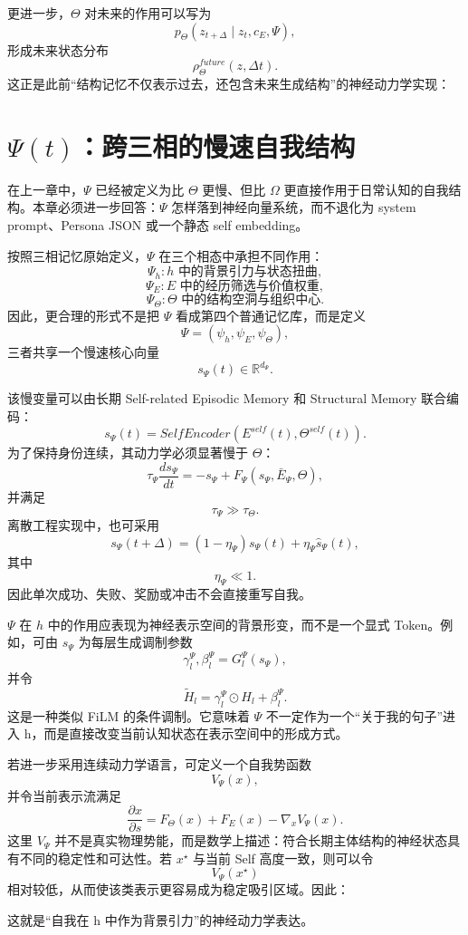 更进一步，$\Theta$ 对未来的作用可以写为
\[
p_\Theta
\left(
z_{t+\Delta}
\mid
z_t,c_E,\Psi
\right),
\]
形成未来状态分布
\[
\rho_\Theta^{future}(z,\Delta t).
\]
这正是此前“结构记忆不仅表示过去，还包含未来生成结构”的神经动力学实现：
\begin{statementbox}
\centering
{}
\end{statementbox}

\section{$\Psi(t)$：跨三相的慢速自我结构}

在上一章中，$\Psi$ 已经被定义为比 $\Theta$ 更慢、但比 $\Omega$ 更直接作用于日常认知的自我结构。本章必须进一步回答：$\Psi$ 怎样落到神经向量系统，而不退化为 system prompt、Persona JSON 或一个静态 self embedding。

按照三相记忆原始定义，$\Psi$ 在三个相态中承担不同作用：
\[
\Psi_h:
\text{$h$ 中的背景引力与状态扭曲},
\]
\[
\Psi_E:
\text{$E$ 中的经历筛选与价值权重},
\]
\[
\Psi_\Theta:
\text{$\Theta$ 中的结构空洞与组织中心}.
\]
因此，更合理的形式不是把 $\Psi$ 看成第四个普通记忆库，而是定义
\[
\Psi
=
\left(
\psi_h,\psi_E,\psi_\Theta
\right),
\]
三者共享一个慢速核心向量
\[
s_\Psi(t)
\in
\mathbb{R}^{d_\Psi}.
\]

该慢变量可以由长期 Self-related Episodic Memory 和 Structural Memory 联合编码：
\[
s_\Psi(t)
=
SelfEncoder
\left(
E^{self}(t),
\Theta^{self}(t)
\right).
\]
为了保持身份连续，其动力学必须显著慢于 $\Theta$：
\[
\tau_\Psi
\frac{ds_\Psi}{dt}
=
-s_\Psi
+
F_\Psi
\left(
s_\Psi,\bar E_\Psi,\Theta
\right),
\]
并满足
\[
\tau_\Psi\gg\tau_\Theta.
\]
离散工程实现中，也可采用
\[
s_\Psi(t+\Delta)
=
(1-\eta_\Psi)s_\Psi(t)
+
\eta_\Psi\widehat{s}_\Psi(t),
\]
其中
\[
\eta_\Psi\ll1.
\]
因此单次成功、失败、奖励或冲击不会直接重写自我。

$\Psi$ 在 $h$ 中的作用应表现为神经表示空间的背景形变，而不是一个显式 Token。例如，可由 $s_\Psi$ 为每层生成调制参数
\[
\gamma_l^\Psi,\beta_l^\Psi
=
G_l^\Psi
\left(
s_\Psi
\right),
\]
并令
\[
\widetilde{H}_l
=
\gamma_l^\Psi
\odot
H_l
+
\beta_l^\Psi.
\]
这是一种类似 FiLM 的条件调制。它意味着 $\Psi$ 不一定作为一个“关于我的句子”进入 h，而是直接改变当前认知状态在表示空间中的形成方式。

若进一步采用连续动力学语言，可定义一个自我势函数
\[
V_\Psi(x),
\]
并令当前表示流满足
\[
\frac{\partial x}{\partial s}
=
F_\Theta(x)
+
F_E(x)
-
\nabla_xV_\Psi(x).
\]
这里 $V_\Psi$ 并不是真实物理势能，而是数学上描述：符合长期主体结构的神经状态具有不同的稳定性和可达性。若 $x^\star$ 与当前 Self 高度一致，则可以令
\[
V_\Psi(x^\star)
\]
相对较低，从而使该类表示更容易成为稳定吸引区域。因此：
\begin{statementbox}
\centering
{}
\end{statementbox}
这就是“自我在 h 中作为背景引力”的神经动力学表达。

